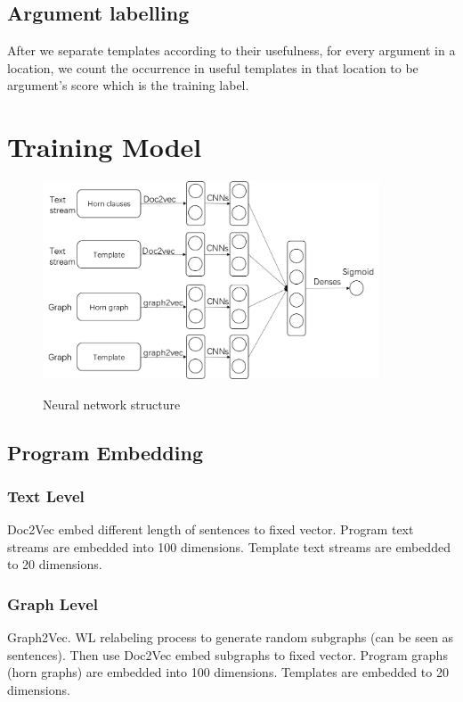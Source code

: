 \documentclass{article}
\begin{document}
\subsection{Argument labelling}
After we separate templates according to their usefulness, for every argument in a location, we count the occurrence in useful templates in that location to be argument's score which is the training label.

\section{Training Model}


\begin{figure}[h]
\centering
  \includegraphics[width=10cm]{graph/NNstructure}\\
  \caption{Neural network structure}\label{NNstructure}
\end{figure}
\subsection{Program Embedding}

\subsubsection{Text Level}
Doc2Vec \cite{DBLP:journals/corr/LeM14} embed different length of sentences to fixed vector.
Program text streams are embedded into 100 dimensions. Template text streams are embedded to 20 dimensions.
\subsubsection{Graph Level}
Graph2Vec\cite{DBLP:journals/corr/NarayananCVCLJ17}.
WL relabeling process \cite{WL_relabeling_process} to generate random subgraphs (can be seen as sentences). Then use Doc2Vec embed subgraphs to fixed vector.
Program graphs (horn graphs) are embedded into 100 dimensions. Templates are embedded to 20 dimensions.
\end{document}
